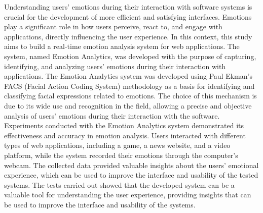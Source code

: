 \begin{resumo-ingles}

  Understanding users' emotions during their interaction with software systems is crucial for the development of more efficient and satisfying interfaces. Emotions play a significant role in how users perceive, react to, and engage with applications, directly influencing the user experience. In this context, this study aims to build a real-time emotion analysis system for web applications. The system, named Emotion Analytics, was developed with the purpose of capturing, identifying, and analyzing users' emotions during their interaction with applications. The Emotion Analytics system was developed using Paul Ekman's FACS (Facial Action Coding System) methodology as a basis for identifying and classifying facial expressions related to emotions. The choice of this mechanism is due to its wide use and recognition in the field, allowing a precise and objective analysis of users' emotions during their interaction with the software. Experiments conducted with the Emotion Analytics system demonstrated its effectiveness and accuracy in emotion analysis. Users interacted with different types of web applications, including a game, a news website, and a video platform, while the system recorded their emotions through the computer's webcam. The collected data provided valuable insights about the users' emotional experience, which can be used to improve the interface and usability of the tested systems. The tests carried out showed that the developed system can be a valuable tool for understanding the user experience, providing insights that can be used to improve the interface and usability of the systems.


\end{resumo-ingles}
